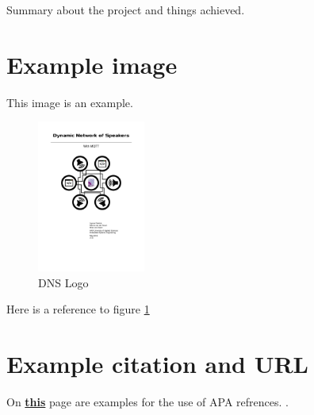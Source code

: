 Summary about the project and things achieved.

\section*{Example image}
This image is an example.

\begin{figure}[h]
    \centering
    \includegraphics[height=5cm]{dynamic_network_of_speakers}
    \caption{DNS Logo}
    \label{fig:DNS Logo}
\end{figure}

Here is a reference to figure \ref{fig:DNS Logo}

\section*{Example citation and URL}
On \href{https://en.wikibooks.org/wiki/LaTeX/Bibliography_Management#Standard_templates}{\textbf{this}} page are examples for the use of APA refrences. \cite{BiberTemplates}.
